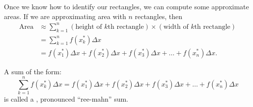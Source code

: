 \documentclass{ximera}
\begin{document}
Once we know how to identify our rectangles, we can compute some
approximate areas. If we are approximating area with $n$ rectangles, then 
\begin{align*}
  \text{Area} &\approx \sum_{k=1}^n (\text{height of $k$th rectangle})\times(\text{width of $k$th rectangle}) \\
  &=\sum_{k=1}^n  f(x_k^*)\Delta x \\
  &=  f(x_1^*)\Delta x +  f(x_2^*)\Delta x +   f(x_3^*)\Delta x + \dots +   f(x_n^*)\Delta x. 
\end{align*}


\begin{definition}
  A sum of the form:
  \[
  \sum_{k=1}^n  f(x_k^*)\Delta x  = f(x_1^*)\Delta x +  f(x_2^*)\Delta x +   f(x_3^*)\Delta x + \dots +   f(x_n^*)\Delta x
  \]
  is called a , pronounced ``ree-mahn'' sum. 
\end{definition}
\end{document}
